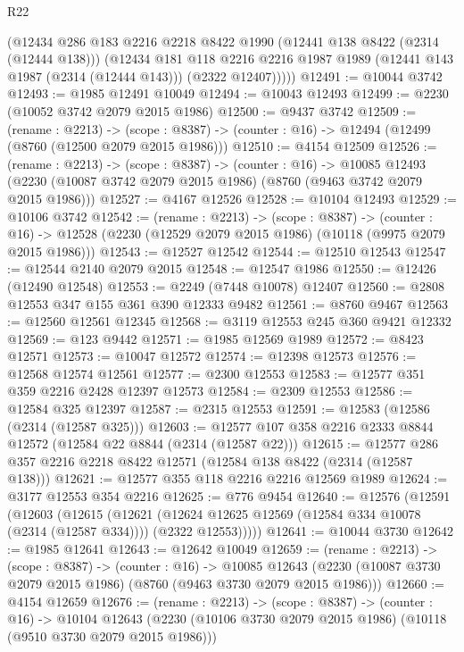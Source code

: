 \begin{lexlean}{R22}
\begin{coremodule}
        (@12434
          @286
          @183
          @2216
          @2218
          @8422
          @1990
          (@12441 @138 @8422 (@2314 (@12444 @138)))
          (@12434
            @181
            @118
            @2216
            @2216
            @1987
            @1989
            (@12441 @143 @1987 (@2314 (@12444 @143)))
            (@2322 @12407)))))
@12491 := @10044 @3742
@12493 := @1985 @12491 @10049
@12494 := @10043 @12493
@12499 := @2230 (@10052 @3742 @2079 @2015 @1986)
@12500 := @9437 @3742
@12509 := (rename : @2213) ->
  (scope : @8387) -> (counter : @16) -> @12494 (@12499 (@8760 (@12500 @2079 @2015 @1986)))
@12510 := @4154 @12509
@12526 := (rename : @2213) ->
  (scope : @8387) ->
  (counter : @16) ->
  @10085 @12493 (@2230 (@10087 @3742 @2079 @2015 @1986) (@8760 (@9463 @3742 @2079 @2015 @1986)))
@12527 := @4167 @12526
@12528 := @10104 @12493
@12529 := @10106 @3742
@12542 := (rename : @2213) ->
  (scope : @8387) ->
  (counter : @16) -> @12528 (@2230 (@12529 @2079 @2015 @1986) (@10118 (@9975 @2079 @2015 @1986)))
@12543 := @12527 @12542
@12544 := @12510 @12543
@12547 := @12544 @2140 @2079 @2015
@12548 := @12547 @1986
@12550 := @12426 (@12490 @12548)
@12553 := @2249 (@7448 @10078) @12407
@12560 := @2808 @12553 @347 @155 @361 @390 @12333 @9482
@12561 := @8760 @9467
@12563 := @12560 @12561 @12345
@12568 := @3119 @12553 @245 @360 @9421 @12332
@12569 := @123 @9442
@12571 := @1985 @12569 @1989
@12572 := @8423 @12571
@12573 := @10047 @12572
@12574 := @12398 @12573
@12576 := @12568 @12574 @12561
@12577 := @2300 @12553
@12583 := @12577 @351 @359 @2216 @2428 @12397 @12573
@12584 := @2309 @12553
@12586 := @12584 @325 @12397
@12587 := @2315 @12553
@12591 := @12583 (@12586 (@2314 (@12587 @325)))
@12603 := @12577 @107 @358 @2216 @2333 @8844 @12572 (@12584 @22 @8844 (@2314 (@12587 @22)))
@12615 := @12577 @286 @357 @2216 @2218 @8422 @12571 (@12584 @138 @8422 (@2314 (@12587 @138)))
@12621 := @12577 @355 @118 @2216 @2216 @12569 @1989
@12624 := @3177 @12553 @354 @2216
@12625 := @776 @9454
@12640 := @12576
    (@12591
      (@12603
        (@12615
          (@12621
            (@12624 @12625 @12569 (@12584 @334 @10078 (@2314 (@12587 @334))))
            (@2322 @12553)))))
@12641 := @10044 @3730
@12642 := @1985 @12641
@12643 := @12642 @10049
@12659 := (rename : @2213) ->
  (scope : @8387) ->
  (counter : @16) ->
  @10085 @12643 (@2230 (@10087 @3730 @2079 @2015 @1986) (@8760 (@9463 @3730 @2079 @2015 @1986)))
@12660 := @4154 @12659
@12676 := (rename : @2213) ->
  (scope : @8387) ->
  (counter : @16) ->
  @10104 @12643 (@2230 (@10106 @3730 @2079 @2015 @1986) (@10118 (@9510 @3730 @2079 @2015 @1986)))

\end{coremodule}
\end{lexlean}
